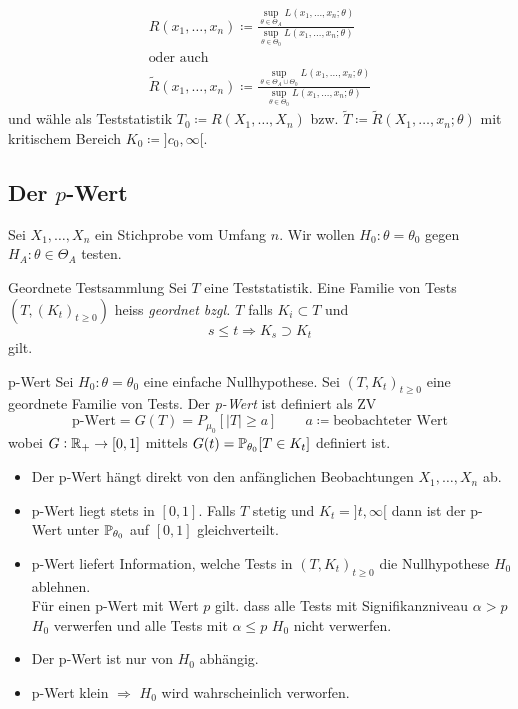 \begin{gather*}
	R (x_1 , \ldots , x_n) \coloneqq \frac{\sup_{\theta \in \Theta_A} L (x_1 , \ldots , x_n ; \theta)}{\sup_{\theta \in
	\Theta_0} L (x_1 , \ldots , x_n ; \theta)}\\
	\text{oder auch}\\
	\tilde{R} (x_1 , \ldots , x_n) \coloneqq \frac{\sup_{\theta \in \Theta_A \cup \Theta_0} L (x_1 , \ldots , x_n ; \theta)}{\sup_{\theta \in
	\Theta_0} L (x_1 , \ldots , x_n ; \theta)}
\end{gather*}
und wähle als Teststatistik $T_0 \coloneqq R (X_1 , \ldots , X_n)$ bzw. $\tilde{T} \coloneqq \tilde{R} (X_1 , \ldots ,
x_n ; \theta)$ mit kritischem Bereich $K_0 \coloneqq ]c_0,\infty[$.

\staredssubend


\subsection*{Der $p$-Wert}%
\label{sub:der_p_wert}

Sei $X_1, \ldots , X_n$ ein Stichprobe vom Umfang $n$. Wir wollen $H_0 : \theta = \theta_0$ gegen $H_A : \theta \in
\Theta_A$ testen. 
\begin{definition}{Geordnete Testsammlung}
	Sei $T$ eine Teststatistik. Eine Familie von Tests $(T, (K_t)_{t \geq 0})$ heiss \emph{geordnet bzgl. $T$} falls $K_i
	\subset T$ und 
	\begin{equation*}
		s \leq t \Longrightarrow K_s \supset K_t
	\end{equation*}
	gilt.
\end{definition}
\begin{definition}{p-Wert}
	Sei $H_0 : \theta = \theta_0$ eine einfache Nullhypothese. Sei $(T,K_t)_{t \geq 0}$ eine geordnete Familie von Tests.
	Der \emph{p-Wert} ist definiert als ZV
	\begin{equation*}
		\text{p-Wert} = G(T) = P_{\mu_0} [|T| \geq a] \qquad a \coloneqq \text{beobachteter Wert}
	\end{equation*}
	wobei $G: \mathbb{R}_+ \rightarrow [0,1]$ mittels $G(t) = \mathbb{P}_{\theta_0}[T \in K_t]$ definiert ist.
\end{definition}

\begin{itemize}
	\item Der p-Wert hängt direkt von den anfänglichen Beobachtungen $X_1 , \ldots , X_n$ ab.
	\item p-Wert liegt stets in $[0,1]$. Falls $T$ stetig und $K_t = ]t,\infty[$ dann ist der p-Wert unter
		$\mathbb{P}_{\theta_0}$ auf $[0,1]$ gleichverteilt.
	\item p-Wert liefert Information, welche Tests in $(T, K_t)_{t \geq 0}$ die Nullhypothese $H_0$ ablehnen.\\
		Für einen p-Wert mit Wert $p$ gilt. dass alle Tests mit Signifikanzniveau $ \alpha > p$ $H_0$ verwerfen und alle
		Tests mit $\alpha \leq p$ $H_0$ nicht verwerfen.
	\item Der p-Wert ist nur von $H_0$ abhängig.
	\item p-Wert klein $\Longrightarrow$ $H_0$ wird wahrscheinlich verworfen.
\end{itemize}
